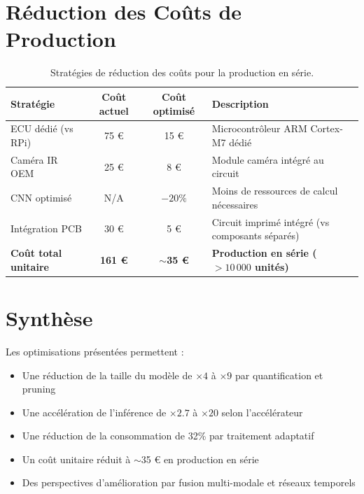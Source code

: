 \documentclass[12pt,a4paper,twoside]{report}
\begin{document}
\section{Réduction des Coûts de Production}

\begin{table}[H]
\centering
\caption{Stratégies de réduction des coûts pour la production en série.}
\label{tab:cost_reduction}
\renewcommand{\arraystretch}{1.4}
\begin{tabularx}{\textwidth}{|l|c|c|X|}
\hline
\rowcolor{stellantisblue!15}
\textbf{Stratégie} & \textbf{Coût actuel} & \textbf{Coût optimisé} & \textbf{Description} \\
\hline
ECU dédié (vs RPi) & 75 € & 15 € & Microcontrôleur ARM Cortex-M7 dédié \\
\hline
Caméra IR OEM & 25 € & 8 € & Module caméra intégré au circuit \\
\hline
CNN optimisé & N/A & $-20\%$ & Moins de ressources de calcul nécessaires \\
\hline
Intégration PCB & 30 € & 5 € & Circuit imprimé intégré (vs composants séparés) \\
\hline
\textbf{Coût total unitaire} & \textbf{161 €} & \textbf{$\sim$35 €} & \textbf{Production en série ($> 10\,000$ unités)} \\
\hline
\end{tabularx}
\end{table}

\section{Synthèse}

Les optimisations présentées permettent :
\begin{itemize}
    \item Une réduction de la taille du modèle de $\times 4$ à $\times 9$ par quantification et pruning
    \item Une accélération de l'inférence de $\times 2.7$ à $\times 20$ selon l'accélérateur
    \item Une réduction de la consommation de 32\% par traitement adaptatif
    \item Un coût unitaire réduit à $\sim$35 € en production en série
    \item Des perspectives d'amélioration par fusion multi-modale et réseaux temporels
\end{itemize}

\end{document}
